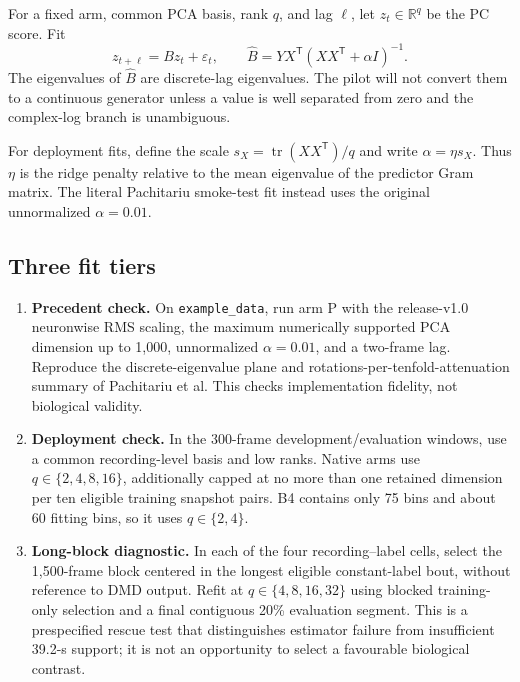 \documentclass[11pt,a4paper]{article}
\newcommand{\T}{^{\mathsf T}}
\newcommand{\R}{\mathbb{R}}
\DeclareMathOperator{\tr}{tr}
\begin{document}
For a fixed arm, common PCA basis, rank $q$, and lag $\ell$, let
$z_t\in\R^q$ be the PC score. Fit
\begin{equation}
  z_{t+\ell}=Bz_t+\varepsilon_t,
  \qquad
  \widehat B=YX\T\left(XX\T+\alpha I\right)^{-1}.
\end{equation}
The eigenvalues of $\widehat B$ are discrete-lag eigenvalues. The pilot will not
convert them to a continuous generator unless a value is well separated from
zero and the complex-log branch is unambiguous.

For deployment fits, define the scale
$s_X=\tr(XX\T)/q$ and write $\alpha=\eta s_X$. Thus $\eta$ is the ridge penalty
relative to the mean eigenvalue of the predictor Gram matrix. The literal
Pachitariu smoke-test fit instead uses the original unnormalized $\alpha=0.01$.

\subsection{Three fit tiers}

\begin{enumerate}
  \item \textbf{Precedent check.} On \texttt{example\_data}, run arm P with
  the release-v1.0 neuronwise RMS scaling, the maximum numerically supported PCA
  dimension up to 1,000, unnormalized $\alpha=0.01$, and a two-frame lag.
  Reproduce the discrete-eigenvalue plane and rotations-per-tenfold-attenuation
  summary of Pachitariu et al. This checks implementation fidelity, not
  biological validity.
  \item \textbf{Deployment check.} In the 300-frame development/evaluation
  windows, use a common recording-level basis and low ranks. Native arms use
  $q\in\{2,4,8,16\}$, additionally capped at no more than one retained
  dimension per ten eligible training snapshot pairs. B4 contains only 75 bins
  and about 60 fitting bins, so it uses $q\in\{2,4\}$.
  \item \textbf{Long-block diagnostic.} In each of the four recording--label
  cells, select the 1,500-frame block centered in the longest eligible
  constant-label bout, without reference to DMD output. Refit at
  $q\in\{4,8,16,32\}$ using blocked training-only selection and a final
  contiguous 20\% evaluation segment. This is a prespecified rescue test that
  distinguishes estimator failure from insufficient 39.2-s support; it is not
  an opportunity to select a favourable biological contrast.
\end{enumerate}
\end{document}
